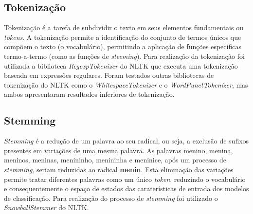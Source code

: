 \subsection{Tokenização}

Tokenização é a tarefa de subdividir o texto em seus elementos fundamentais ou \textit{tokens}. A tokenização permite a identificação do conjunto de termos únicos que compõem o texto (o vocabulário), permitindo a aplicação de funções específicas termo-a-termo (como as funções de \textit{steeming}). Para realização da tokenização foi utilizada a biblioteca \textit{RegexpTokenizer} do NLTK que executa uma tokenização baseada em expressões regulares. Foram testados outras bibliotecas de tokenização do NLTK como o \textit{WhitespaceTokenizer} e o \textit{WordPunctTokenizer}, mas ambos apresentaram resultados inferiores de tokenização.

\subsection{Stemming}

\textit{Stemming} é a redução de um palavra ao seu radical, ou seja, a exclusão de sufixos presentes em variações de uma mesma palavra. As palavras menino, menina, meninos,  meninas, menininho, menininha e meninice, após um processo de \textit{stemming}, seriam reduzidas ao radical \textbf{menin}. Esta eliminação das variações permite tratar diferentes palavras como um único \textit{token}, reduzindo o vocabulário e consequentemente o espaço de estados das caraterísticas de entrada dos modelos de classificação. Para realização do processo de \textit{stemming} foi utilizado o \textit{SnowballStemmer} do NLTK.